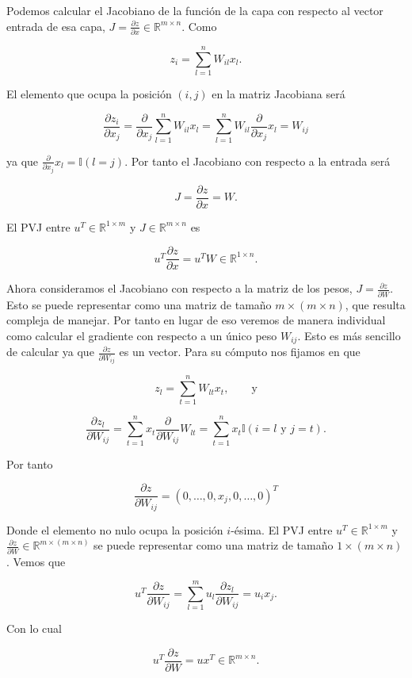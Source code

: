 Podemos calcular el Jacobiano de la función de la capa con respecto al vector entrada de esa capa, $J=\frac{\partial z}{\partial x} \in \mathbb{R}^{m \times n}$. Como

$$z_i = \sum_{l=1}^n W_{il}x_l.$$

El elemento que ocupa la posición $(i,j)$ en la matriz Jacobiana será 

$$\frac{\partial z_i}{\partial x_j} = \frac{\partial}{\partial x_j} \sum_{l=1}^n W_{il} x_l = \sum_{l=1}^n W_{il} \frac{\partial}{\partial x_j} x_l = W_{ij}$$

ya que $\frac{\partial}{\partial x_j} x_l= \mathbb{I} (l=j)$. Por tanto el Jacobiano con respecto a la entrada será

$$J=\frac{\partial z}{\partial x}=W.$$

El PVJ entre $u^T \in \mathbb{R}^{1 \times m}$ y $J \in \mathbb{R}^{m \times n}$ es

$$u^T \frac{\partial z}{\partial x} = u^T W \in \mathbb{R}^{1 \times n}.$$

Ahora consideramos el Jacobiano con respecto a la matriz de los pesos, $J=\frac{\partial z}{\partial W}$. Esto se puede representar como una matriz de tamaño $m \times (m \times n)$, que resulta compleja de manejar. Por tanto en lugar de eso veremos de manera individual como calcular el gradiente con respecto a un único peso $W_{ij}$. Esto es más sencillo de calcular ya que $\frac{\partial z}{\partial W_{ij}}$ es un vector. Para su cómputo nos fijamos en que 

$$z_l = \sum_{t=1}^n W_{lt}x_t, \qquad \textrm{y}$$

$$\frac{\partial z_l}{\partial W_{ij}} = \sum_{t=1}^n x_t \frac{\partial}{\partial W_{ij}} W_{lt} = \sum_{t=1}^n x_t \mathbb{I}(i=l \textrm{ y } j=t) .$$

Por tanto

$$\frac{\partial z}{\partial W_{ij}} = \left ( 0, \ldots, 0, x_j,  0, \ldots, 0 \right )^T$$

Donde el elemento no nulo ocupa la posición $i$-ésima. El PVJ entre $u^T \in \mathbb{R}^{1 \times m}$ y $\frac{\partial z}{\partial W} \in \mathbb{R}^{m \times ( m \times n)}$ se puede representar como una matriz de tamaño $1 \times (m \times n)$. Vemos que 

$$u^T \frac{\partial z}{\partial W_{ij}}= \sum_{l=1}^m u_l \frac{\partial z_l}{\partial W_{ij}} = u_i x_j.$$

Con lo cual

$$ u^T \frac{\partial z}{\partial W}  = ux^T \in \mathbb{R}^{m \times n}.$$



